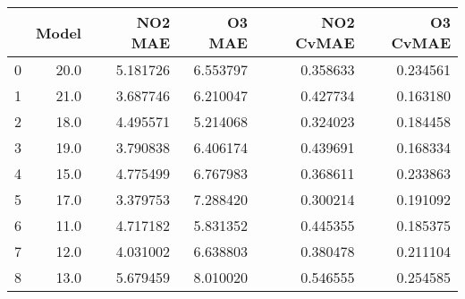 \begin{tabular}{lrrrrr}
\toprule
{} &  Model &   NO2 MAE &    O3 MAE &  NO2 CvMAE &  O3 CvMAE \\
\midrule
0 &   20.0 &  5.181726 &  6.553797 &   0.358633 &  0.234561 \\
1 &   21.0 &  3.687746 &  6.210047 &   0.427734 &  0.163180 \\
2 &   18.0 &  4.495571 &  5.214068 &   0.324023 &  0.184458 \\
3 &   19.0 &  3.790838 &  6.406174 &   0.439691 &  0.168334 \\
4 &   15.0 &  4.775499 &  6.767983 &   0.368611 &  0.233863 \\
5 &   17.0 &  3.379753 &  7.288420 &   0.300214 &  0.191092 \\
6 &   11.0 &  4.717182 &  5.831352 &   0.445355 &  0.185375 \\
7 &   12.0 &  4.031002 &  6.638803 &   0.380478 &  0.211104 \\
8 &   13.0 &  5.679459 &  8.010020 &   0.546555 &  0.254585 \\
\bottomrule
\end{tabular}
